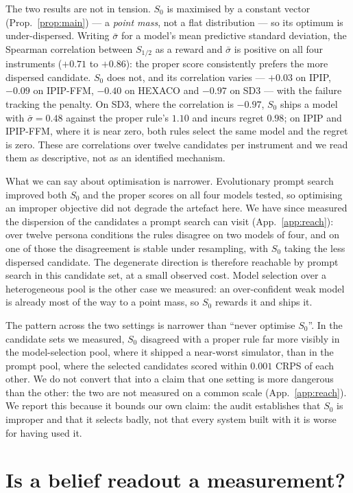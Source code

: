 \documentclass[11pt]{article}
\begin{document}
The two results are not in tension. $S_0$ is maximised by a constant vector
(Prop.~\ref{prop:main}) --- a \emph{point mass}, not a flat distribution --- so
its optimum is under-dispersed. Writing $\bar\sigma$ for a model's mean
predictive standard deviation, the Spearman correlation between $S_{1/2}$ as a
reward and $\bar\sigma$ is positive on all four instruments ($+0.71$ to
$+0.86$): the proper score consistently prefers the more dispersed candidate.
$S_0$ does not, and its correlation varies --- $+0.03$ on IPIP, $-0.09$ on
IPIP-FFM, $-0.40$ on HEXACO and $-0.97$ on SD3 --- with the failure tracking
the penalty. On SD3, where the correlation is $-0.97$, $S_0$ ships a model with
$\bar\sigma=0.48$ against the proper rule's $1.10$ and incurs regret $0.98$; on
IPIP and IPIP-FFM, where it is near zero, both rules select the same model and
the regret is zero. These are correlations over twelve candidates per
instrument and we read them as descriptive, not as an identified mechanism.

What we can say about optimisation is narrower. Evolutionary prompt search
improved both $S_0$ and the proper scores on all four models tested, so
optimising an improper objective did not degrade the artefact here. We have
since measured the dispersion of the candidates a prompt search can visit
(App.~\ref{app:reach}): over twelve persona conditions the rules disagree on
two models of four, and on one of those the disagreement is stable under
resampling, with $S_0$ taking the less dispersed candidate. The degenerate
direction is therefore reachable by prompt search in this candidate set, at a
small observed cost. Model selection over a heterogeneous pool is the other
case we measured: an over-confident weak model is already most of the way to a
point mass, so $S_0$ rewards it and ships it.

The pattern across the two settings is narrower than ``never optimise $S_0$''.
In the candidate sets we measured, $S_0$ disagreed with a proper rule far more
visibly in the model-selection pool, where it shipped a near-worst simulator,
than in the prompt pool, where the selected candidates scored within
$0.001$ CRPS of each other. We do not convert that into a claim that one setting
is more dangerous than the other: the two are not measured on a common scale
(App.~\ref{app:reach}). We report
this because it bounds our own claim: the audit establishes that $S_0$ is
improper and that it selects badly, not that every system built with it is
worse for having used it.

\section{Is a belief readout a measurement?}
\label{app:repro}
\end{document}
